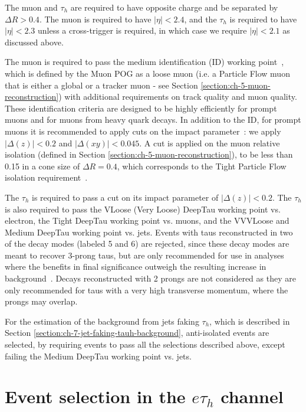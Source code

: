 The muon and $\tau_h$ are required to have opposite charge and be separated by $\Delta R > 0.4$. The muon is required to have $|\eta| < 2.4$, and the $\tau_{h}$ is required to have $|\eta| < 2.3$ unless a cross-trigger is required, in which case we require $|\eta| < 2.1$ as discussed above.

The muon is required to pass the medium identification (ID) working point~\cite{twiki_MUON_POG_Run2_guide}, which is defined by the Muon POG as a loose muon (i.e. a Particle Flow muon that is either a global or a tracker muon - see Section \ref{section:ch-5-muon-reconstruction}) with additional requirements on track quality and muon quality. These identification criteria are designed to be highly efficiently for prompt muons and for muons from heavy quark decays. In addition to the ID, for prompt muons it is recommended to apply cuts on the impact parameter~\cite{twiki_MUON_POG_Run2_guide}: we apply $|\Delta(z)| < 0.2$ and $|\Delta(xy)| < 0.045$. A cut is applied on the muon relative isolation (defined in Section \ref{section:ch-5-muon-reconstruction}), to be less than 0.15 in a cone size of $\Delta R = 0.4$, which corresponds to the Tight Particle Flow isolation requirement~\cite{twiki_MUON_POG_Run2_guide}.

The $\tau_h$ is required to pass a cut on its impact parameter of $|\Delta(z)| < 0.2$. The $\tau_h$ is also required to pass the VLoose (Very Loose) DeepTau working point vs. electron, the Tight DeepTau working point vs. muons, and the VVVLoose and Medium DeepTau working point vs. jets. Events with taus reconstructed in two of the decay modes (labeled 5 and 6) are rejected, since these decay modes are meant to recover 3-prong taus, but are only recommended for use in analyses where the benefits in final significance outweigh the resulting increase in background~\cite{twiki_TAU_POG_tauidrecommendationforrun2}. Decays reconstructed with 2 prongs are not considered as they are only recommended for taus with a very high transverse momentum, where the prongs may overlap.

For the estimation of the background from jets faking $\tau_{h}$, which is described in Section \ref{section:ch-7-jet-faking-tauh-background}, anti-isolated events are selected, by requiring events to pass all the selections described above, except failing the Medium DeepTau working point vs. jets.

\section{Event selection in the \texorpdfstring{$e\tau_{h}$}{etauh} channel}
\label{section:ch-6-event-selection-etau}

